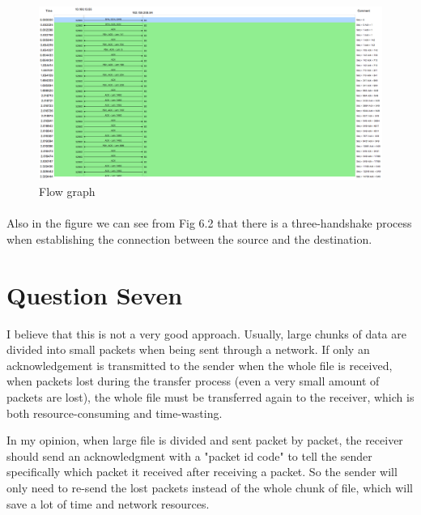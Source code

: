 \documentclass[paper=a4, fontsize=11pt]{scrartcl} %
\numberwithin{equation}{section} %
\numberwithin{figure}{section} %
\numberwithin{table}{section} %
\begin{document}
\begin{figure}[htbp!]
		\centering
		\includegraphics[width=1.0\textwidth]{assigment_1_pics/2}
		\caption{Flow graph}%
		\vspace{-1em}
\end{figure}
\paragraph{} 
Also in the figure we can see from Fig 6.2 that there is a three-handshake process when establishing the connection between the source and the destination.



\section{Question Seven }
I believe that this is not a very good approach. Usually, large chunks of data are divided into small packets when being sent through a network. If only an acknowledgement is transmitted to the sender when the whole file is received, when packets lost during the transfer process (even a very small amount of packets are lost), the whole file must be transferred again to the receiver, which is both resource-consuming and time-wasting.

\vbox{}
In my opinion, when large file is divided and sent packet by packet, the receiver should send an acknowledgment with a "packet id code" to tell the sender specifically which packet it received after receiving a packet. So the sender will only need to re-send the lost packets instead of the whole chunk of file, which will save a lot of time and network resources.


\end{document}
